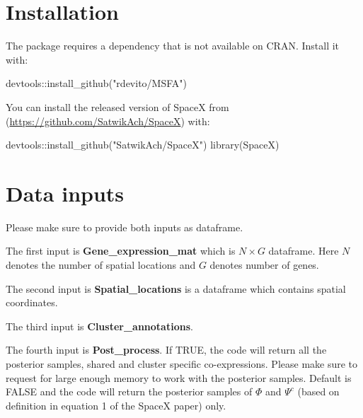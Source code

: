 \documentclass[
]{book}
\newenvironment{Shaded}{\begin{snugshade}}{\end{snugshade}}
\newcommand{\FunctionTok}[1]{\textcolor[rgb]{0.00,0.00,0.00}{#1}}
\newcommand{\NormalTok}[1]{#1}
\newcommand{\SpecialCharTok}[1]{\textcolor[rgb]{0.00,0.00,0.00}{#1}}
\newcommand{\StringTok}[1]{\textcolor[rgb]{0.31,0.60,0.02}{#1}}
\begin{document}
\hypertarget{installation}{%
\section{Installation}\label{installation}}

The package requires a dependency that is not available on CRAN. Install it with:

\begin{Shaded}
\begin{Highlighting}[]
\NormalTok{devtools}\SpecialCharTok{::}\FunctionTok{install\_github}\NormalTok{(}\StringTok{"rdevito/MSFA"}\NormalTok{)}
\end{Highlighting}
\end{Shaded}

You can install the released version of SpaceX from (\url{https://github.com/SatwikAch/SpaceX}) with:

\begin{Shaded}
\begin{Highlighting}[]
\NormalTok{devtools}\SpecialCharTok{::}\FunctionTok{install\_github}\NormalTok{(}\StringTok{"SatwikAch/SpaceX"}\NormalTok{)}
\FunctionTok{library}\NormalTok{(SpaceX)}
\end{Highlighting}
\end{Shaded}

\hypertarget{data-inputs}{%
\section{Data inputs}\label{data-inputs}}

Please make sure to provide both inputs as dataframe.

The first input is \textbf{Gene\_expression\_mat} which is \(N \times G\) dataframe. Here \(N\) denotes the number of spatial locations and \(G\) denotes number of genes.

The second input is \textbf{Spatial\_locations} is a dataframe which contains spatial coordinates.

The third input is \textbf{Cluster\_annotations}.

The fourth input is \textbf{Post\_process}. If TRUE, the code will return all the posterior samples, shared and cluster specific co-expressions. Please make sure to request for large enough memory to work with the posterior samples. Default is FALSE and the code will return the posterior samples of \(\Phi\) and \(\Psi^c\) (based on definition in equation 1 of the SpaceX paper) only.
\end{document}
